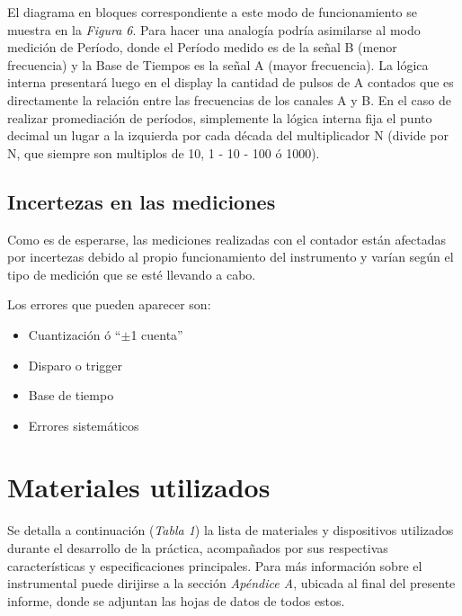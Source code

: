 \documentclass{article}
\begin{document}
	El diagrama en bloques correspondiente a este modo de funcionamiento se muestra en la \textit{Figura 6}. Para hacer una analogía podría asimilarse al modo medición de Período, donde el Período medido es de la señal B (menor frecuencia) y la Base de Tiempos es la señal A (mayor frecuencia). La lógica interna presentará luego en el display la cantidad de pulsos de A contados que es directamente la relación entre las frecuencias de los canales A y B. En el caso de realizar promediación de períodos, simplemente la lógica interna fija el punto decimal un lugar a la izquierda por cada década del multiplicador N (divide por N, que siempre son multiplos de 10, 1 - 10 - 100 ó 1000).
\bigskip\bigskip



\subsection{Incertezas en las mediciones} 
\medskip
	
	Como es de esperarse, las mediciones realizadas con el contador están afectadas por incertezas debido al propio funcionamiento del instrumento y varían según el tipo de medición que se esté llevando a cabo.
	\par
	Los errores que pueden aparecer son:

	\begin{itemize}
		\itemsep=3pt \topsep=0pt \partopsep=0pt \parskip=0pt \parsep=0pt
	
		\item Cuantización ó ``$\pm$1 cuenta''
		\item Disparo o trigger
		\item Base de tiempo
		\item Errores sistemáticos
	\end{itemize}
\bigskip\bigskip




\section{Materiales utilizados}

	Se detalla a continuación (\textit{Tabla 1}) la lista de materiales y dispositivos utilizados durante el desarrollo de la práctica, acompañados por sus respectivas características y especificaciones principales. Para más información sobre el instrumental puede dirijirse a la sección \textit{Apéndice A}, ubicada al final del presente informe, donde se adjuntan las hojas de datos de todos estos.
\bigskip\bigskip
\end{document}
